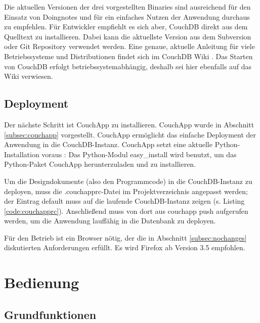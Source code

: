 Die aktuellen Versionen der drei vorgestellten Binaries sind ausreichend für den Einsatz von Doingnotes und für ein einfaches Nutzen der Anwendung durchaus zu empfehlen. Für Entwickler empfiehlt es sich aber, CouchDB direkt aus dem Quelltext zu installieren. Dabei kann die aktuellste Version aus dem Subversion \cite{couch:svn} oder Git \cite{couch:github} Repository verwendet werden. Eine genaue, aktuelle Anleitung für viele Betriebssysteme und Distributionen findet sich im CouchDB Wiki \cite{couch:installation}. Das Starten von CouchDB erfolgt betriebssystemabhängig, deshalb sei hier ebenfalls auf das Wiki verwiesen. 


\subsection{Deployment}
\label{subsec:deployment}

Der nächste Schritt ist CouchApp \cite{couch:couchapp} zu installieren. CouchApp wurde in Abschnitt \ref{subsec:couchapp} vorgestellt. CouchApp ermöglicht das einfache Deployment der Anwendung in die CouchDB-Instanz. CouchApp setzt eine aktuelle Python-Installation voraus \cite{python:homepage}: Das Python-Modul {\selectfont easy\_install} \cite{python:easy} wird benutzt, um das Python-Paket CouchApp herunterzuladen und zu installieren.

Um die Designdokumente (also den Programmcode) in die CouchDB-Instanz zu deployen, muss die {\selectfont .couchapprc}-Datei im Projektverzeichnis angepasst werden; der Eintrag {\selectfont default} muss auf die laufende CouchDB-Instanz zeigen (s. Listing \ref{code:couchapprc}). Anschließend muss von dort aus {\selectfont couchapp push} aufgerufen werden, um die Anwendung lauffähig in die Datenbank zu deployen. 

Für den Betrieb ist ein Browser nötig, der die in Abschnitt \ref{subsec:nochanges} diskutierten Anforderungen erfüllt. Es wird Firefox \cite{firefox} ab Version 3.5 empfohlen.


\section{Bedienung}
\label{sec:bedienung}

\subsection{Grundfunktionen}

